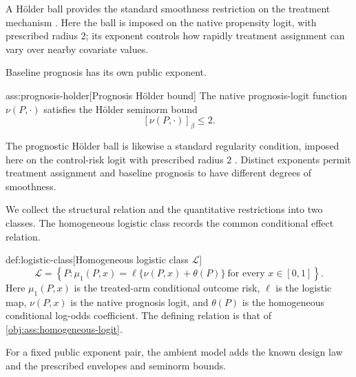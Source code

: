 \documentclass[11pt]{article}
\begin{document}
A Hölder ball provides the standard smoothness restriction on the treatment mechanism \citep{RobinsTchetgenLiVanderVaart2009Minimax}. Here the ball is imposed on the native propensity logit, with prescribed radius \(2\); its exponent controls how rapidly treatment assignment can vary over nearby covariate values.

Baseline prognosis has its own public exponent.

\begin{assumptionv}{ass:prognosis-holder}[Prognosis Hölder bound]
The native prognosis-logit function \(\nu(P,\cdot)\) satisfies the Hölder seminorm bound
\[
[\nu(P,\cdot)]_\beta\le 2.
\]
\end{assumptionv}

The prognostic Hölder ball is likewise a standard regularity condition, imposed here on the control-risk logit with prescribed radius \(2\) \citep{LiuMukherjeeRobinsTchetgen2021Adaptive}. Distinct exponents permit treatment assignment and baseline prognosis to have different degrees of smoothness.

We collect the structural relation and the quantitative restrictions into two classes. The homogeneous logistic class  records the common conditional effect relation.

\begin{definitionv}{def:logistic-class}[Homogeneous logistic class \(\mathcal L\)]
\[
\mathcal L
=
\left\{
P:\mu_1(P,x)=\ell\{\nu(P,x)+\theta(P)\}
\ \text{for every }x\in[0,1]
\right\}.
\]
Here \(\mu_1(P,x)\) is the treated-arm conditional outcome risk, \(\ell\) is the logistic map, \(\nu(P,x)\) is the native prognosis logit, and \(\theta(P)\) is the homogeneous conditional log-odds coefficient. The defining relation is that of \cref{obj:ass:homogeneous-logit}.
\end{definitionv}

For a fixed public exponent pair, the ambient model  adds the known design law and the prescribed envelopes and seminorm bounds.
\end{document}
